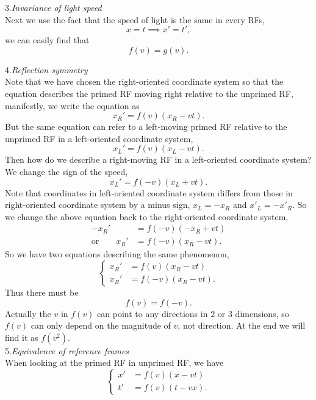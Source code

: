 \documentclass{article}
\newcommand{\be}{\begin{equation}}
\newcommand{\ee}{\end{equation}}
\newcommand{\bs}{\be\begin{split}}
\newcommand{\1}{\left}
\newcommand{\2}{\right}
\begin{document}
3.\textsl{Invariance of light speed}\\

Next we use the fact that the speed of light is the same in every RFs, 
\be
x=t \implies x'=t',
\ee
we can easily find that 
\be
f(v)=g(v).
\ee

4.\textsl{Reflection symmetry}\\

Note that we have chosen the right-oriented coordinate system so that the equation describes the primed RF moving right relative to the unprimed RF, manifestly, we write the equation as
\be
x_R'=f(v)(x_R-vt).
\ee
But the same equation can refer to a left-moving primed RF relative to the unprimed RF in a left-oriented coordinate system,
\be
x_L'=f(v)(x_L-vt).
\ee
Then how do we describe a right-moving RF in a left-oriented coordinate system? We change the sign of the speed,
\be
x_L'=f(-v)(x_L+vt).
\ee
Note that coordinates in left-oriented coordinate system differs from those in right-oriented coordinate system by a minus sign, $x_L=-x_R$ and $x'_L=-x'_R$. So we change the above equation back to the right-oriented coordinate system,
\bs
-x_R'&=f(-v)(-x_R+vt)\\
\text{or} \qquad x_R'&=f(-v)(x_R-vt).
\end{split}\ee
So we have two equations describing the same phenomenon,
\be\1\{\begin{split}
x_R'&=f(v)(x_R-vt)\\
x_R'&=f(-v)(x_R-vt).
\end{split}\2.\ee
Thus there must be
\be
f(v)=f(-v).
\ee
Actually the $v$ in $f(v)$ can point to any directions in $2$ or $3$ dimensions, so $f(v)$ can only depend on the magnitude of $v$, not direction. At the end we will find it as $f(v^2)$.\\

5.\textsl{Equivalence of reference frames}\\

When looking at the primed RF in unprimed RF, we have
\be\1\{\begin{split}
x'&=f(v)(x-vt)\\
t'&=f(v)(t-vx).
\end{split}\2.\ee
\end{document}
